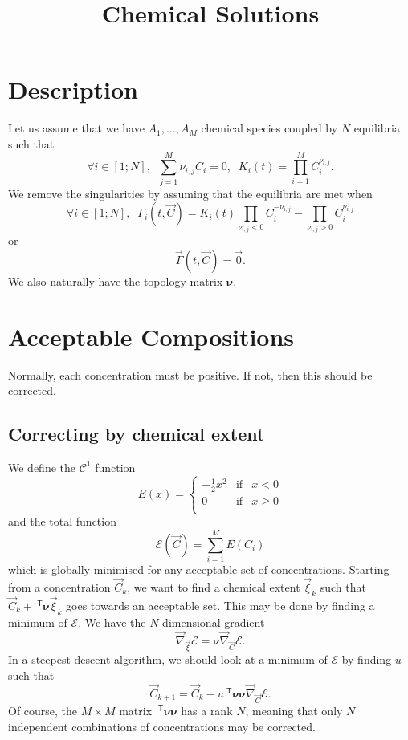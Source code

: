 \documentclass[aps]{revtex4}
\newcommand{\mymat}[1]{\bm{#1}}
\newcommand{\mytrn}[1]{~^{\mathsf{T}}{#1}}
\newcommand{\mygrad}{\vec{\nabla}}
\begin{document}
\title{Chemical Solutions}

\section{Description}
Let us assume that we have $A_1,\ldots,A_M$ chemical species coupled by
$N$ equilibria such that
\begin{equation}
	\forall i \in [1;N], \;\; \sum_{j=1}^{M} \nu_{i,j} C_i = 0, \;\; K_i(t) = \prod_{i=1}^{M} C_i^{\nu_{i,j}}.
\end{equation}
We remove the singularities by assuming that the equilibria are met when
\begin{equation}
	\forall i \in [1;N], \;\; \Gamma_i(t,\vec{C}) = K_i(t) \prod_{\nu_{i,j}<0}  C_i^{-\nu_{i,j}} -  \prod_{\nu_{i,j}>0} C_i^{\nu_{i,j}} 
\end{equation}
or
\begin{equation}
	\vec{\Gamma}(t,\vec{C}) = \vec{0}.
\end{equation}
We also naturally have the topology matrix $\mymat{\nu}$.

\section{Acceptable Compositions}
Normally, each concentration must be positive. If not, then this should be corrected.

\subsection{Correcting by chemical extent}
We define the $\mathcal{C}^1$ function
$$
	E(x) = \left\lbrace
	\begin{array}{rcl}
	-\frac{1}{2} x^2 & \text{if} & x<0\\
	0                & \text{if} & x\geq0\\
	\end{array}
	\right.
$$
and the total function
$$
	\mathcal{E}(\vec{C}) = \sum_{i=1}^M E(C_i)
$$
which is globally minimised for any acceptable set of concentrations.
Starting from a concentration $\vec{C}_k$, we want to find a chemical extent $\vec{\xi}_k$ such that
$\vec{C}_k + \mytrn{\mymat{\nu}}\vec{\xi}_k$ goes towards an acceptable set.
This may be done by finding a minimum of $\mathcal{E}$.
We have the $N$ dimensional gradient
$$
	\mygrad_{\vec{\xi}} \mathcal{E} = \mymat{\nu} \mygrad_{\vec{C}} \mathcal{E}.
$$
In a steepest descent algorithm, we should look at a minimum of $\mathcal{E}$
by finding $u$ such that
$$
	\vec{C}_{k+1} = \vec{C}_{k} - u \mytrn{\mymat{\nu}} \mymat{\nu} \mygrad_{\vec{C}} \mathcal{E}.
$$
Of course, the $M\times M$ matrix $\mytrn{\mymat{\nu}} \mymat{\nu}$ has a rank $N$, meaning that
only $N$ independent combinations of concentrations may be corrected.
\end{document}
